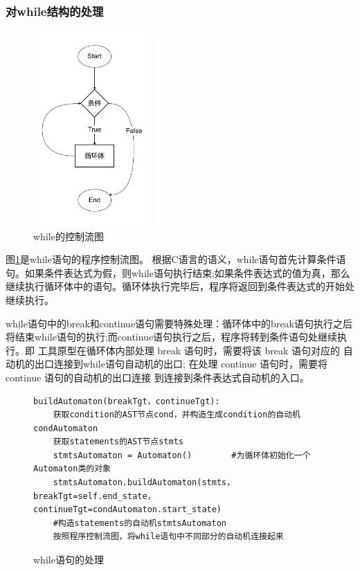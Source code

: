 \subsubsection{对while结构的处理}
 \begin{figure}[htbp]
	\centering
	\includegraphics[width=0.4\textwidth]{pictures/while结构.pdf}
	\caption{while的控制流图}
	\label{fig:while结构}
\end{figure}

图\ref{fig:while结构}是while语句的程序控制流图。
根据C语言的语义，while语句首先计算条件语句。如果条件表达式为假，则while语句执行结束;如果条件表达式的值为真，那么继续执行循环体中的语句。循环体执行完毕后，程序将返回到条件表达式的开始处继续执行。

while语句中的break和continue语句需要特殊处理：循环体中的break语句执行之后将结束while语句的执行;而continue语句执行之后，程序将转到条件语句处继续执行。即
工具原型在循环体内部处理 break 语句时，需要将该 break 语句对应的
自动机的出口连接到while语句自动机的出口; 在处理 continue 语句时，需要将 continue 语句的自动机的出口连接
到连接到条件表达式自动机的入口。\\

\begin{figure}[ht]
	\centering
\begin{minipage}{16cm}
\begin{lstlisting}
buildAutomaton(breakTgt，continueTgt): 
    获取condition的AST节点cond，并构造生成condition的自动机condAutomaton
    获取statements的AST节点stmts
    stmtsAutomaton = Automaton()        #为循环体初始化一个Automaton类的对象
    stmtsAutomaton.buildAutomaton(stmts，breakTgt=self.end_state，continueTgt=condAutomaton.start_state)     
    #构造statements的自动机stmtsAutomaton
    按照程序控制流图，将while语句中不同部分的自动机连接起来
\end{lstlisting}
\end{minipage}
    \caption{while语句的处理}
    \label{while结构处理}
\end{figure}

